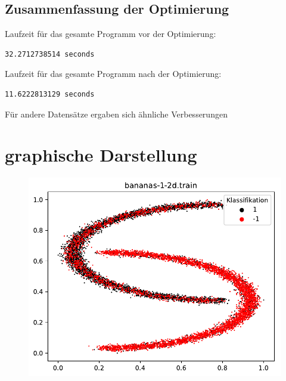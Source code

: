 \documentclass{beamer}
\begin{document}
\subsection{Zusammenfassung der Optimierung}
\begin{frame}[fragile]
Laufzeit für das gesamte Programm vor der Optimierung:
\begin{verbatim}
32.2712738514 seconds
\end{verbatim}
Laufzeit für das gesamte Programm nach der Optimierung:
\begin{verbatim}
11.6222813129 seconds
\end{verbatim}
Für andere Datensätze ergaben sich ähnliche Verbesserungen
\end{frame}

\section{graphische Darstellung}
\begin{figure}[h]
\centering
\includegraphics[scale=0.7]{bananas-1-2d-train.pdf}
\label{bananas}
\end{figure}
\end{document}

